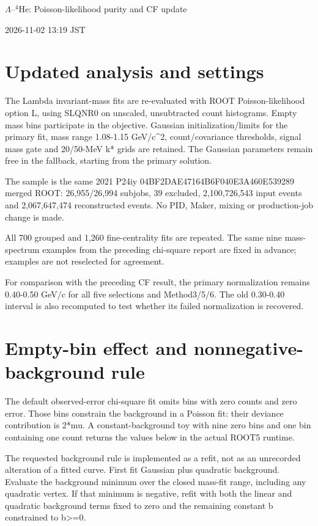 \documentclass[10pt,a4paper]{article}
\begin{document}
\begin{center}{\Large $\Lambda$--$^{4}$He: Poisson-likelihood purity and CF update}\end{center}
2026-11-02 13:19 JST

\section*{Updated analysis and settings}
The Lambda invariant-mass fits are re-evaluated with ROOT Poisson-likelihood option L, using SLQNR0 on unscaled, unsubtracted count histograms. Empty mass bins participate in the objective. Gaussian initialization/limits for the primary fit, mass range 1.08-1.15 GeV/c\textasciicircum{}2, count/covariance thresholds, signal mass gate and 20/50-MeV k* grids are retained. The Gaussian parameters remain free in the fallback, starting from the primary solution.

The sample is the same 2021 P24iy 04BF2DAE47164B6F040E3A460E539289 merged ROOT: 26,955/26,994 subjobs, 39 excluded, 2,100,726,543 input events and 2,067,647,474 reconstructed events. No PID, Maker, mixing or production-job change is made.

All 700 grouped and 1,260 fine-centrality fits are repeated. The same nine mass-spectrum examples from the preceding chi-square report are fixed in advance; examples are not reselected for agreement.

For comparison with the preceding CF result, the primary normalization remains 0.40-0.50 GeV/c for all five selections and Method3/5/6. The old 0.30-0.40 interval is also recomputed to test whether its failed normalization is recovered.

\clearpage
\section*{Empty-bin effect and nonnegative-background rule}
The default observed-error chi-square fit omits bins with zero counts and zero error. Those bins constrain the background in a Poisson fit: their deviance contribution is 2*mu. A constant-background toy with nine zero bins and one bin containing one count returns the values below in the actual ROOT5 runtime.

The requested background rule is implemented as a refit, not as an unrecorded alteration of a fitted curve. First fit Gaussian plus quadratic background. Evaluate the background minimum over the closed mass-fit range, including any quadratic vertex. If that minimum is negative, refit with both the linear and quadratic background terms fixed to zero and the remaining constant b constrained to b>=0.
\end{document}
